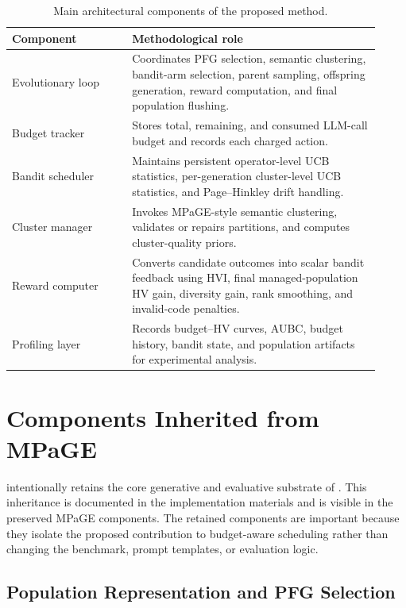 \documentclass[../main.tex]{subfiles}
\begin{document}
\begin{table}[H]
  \centering
  \caption{Main architectural components of the proposed method.}
  \label{tab:method-modules}
  \begin{tabular}{>{\raggedright\arraybackslash}p{0.30\linewidth}>{\raggedright\arraybackslash}p{0.62\linewidth}}
    \toprule
    Component & Methodological role \\
    \midrule
    Evolutionary loop & Coordinates PFG selection, semantic clustering, bandit-arm selection, parent sampling, offspring generation, reward computation, and final population flushing. \\
    Budget tracker & Stores total, remaining, and consumed LLM-call budget and records each charged action. \\
    Bandit scheduler & Maintains persistent operator-level UCB statistics, per-generation cluster-level UCB statistics, and Page--Hinkley drift handling. \\
    Cluster manager & Invokes MPaGE-style semantic clustering, validates or repairs partitions, and computes cluster-quality priors. \\
    Reward computer & Converts candidate outcomes into scalar bandit feedback using HVI, final managed-population HV gain, diversity gain, rank smoothing, and invalid-code penalties. \\
    Profiling layer & Records budget--HV curves, AUBC, budget history, bandit state, and population artifacts for experimental analysis. \\
    \bottomrule
  \end{tabular}
\end{table}

\section{Components Inherited from MPaGE}

\bmab{} intentionally retains the core generative and evaluative substrate of \mpage{}. This inheritance is documented in the implementation materials and is visible in the preserved MPaGE components. The retained components are important because they isolate the proposed contribution to budget-aware scheduling rather than changing the benchmark, prompt templates, or evaluation logic.

\subsection{Population Representation and PFG Selection}
\end{document}
